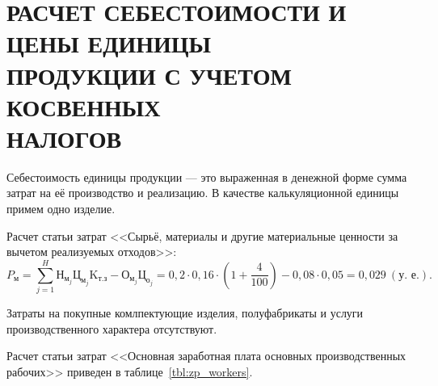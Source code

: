 \section[
Расчет себестоимости и цены единицы продукции с учетом \\
косвенных налогов
]{
РАСЧЕТ СЕБЕСТОИМОСТИ И ЦЕНЫ ЕДИНИЦЫ \\
ПРОДУКЦИИ С УЧЕТОМ КОСВЕННЫХ \\
НАЛОГОВ
}
\label{sec:cost}

Себестоимость единицы продукции --- это выраженная в денежной форме
сумма затрат на её производство и реализацию.
В качестве калькуляционной единицы примем одно изделие.

Расчет статьи затрат 
<<Сырьё, материалы и другие материальные ценности
за вычетом реализуемых отходов>>:
\begin{equation*}
P_{\text{м}} = 
\sum^{H}_{j=1} \text{Н}_{\text{м}_j} \text{Ц}_{\text{м}_j} \text{K}_{\text{т.з}} 
- \text{О}_{\text{м}_j} \text{Ц}_{\text{о}_j} = 
0{,}2 \cdot 0{,}16 \cdot (1 + \dfrac{4}{100}) - 0{,}08 \cdot 0{,}05 =
0{,}029 \: (\text{у.~е.}).
\end{equation*}

Затраты на покупные комлпектующие изделия, 
полуфабрикаты и услуги производственного характера отсутствуют.

Расчет статьи затрат
<<Основная заработная плата основных производственных рабочих>>
приведен в таблице~\ref{tbl:zp_workers}.

